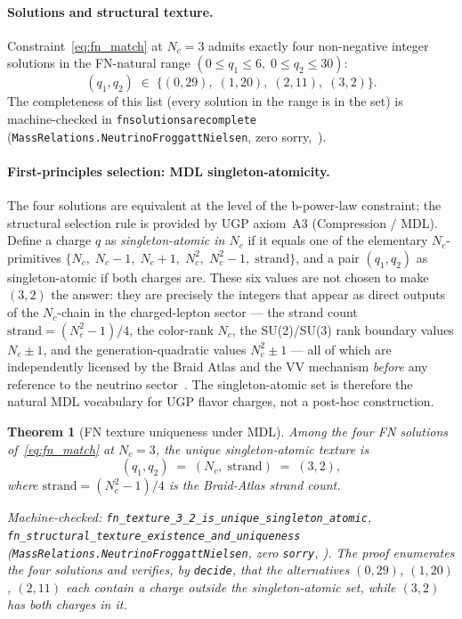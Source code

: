 \documentclass[12pt,a4paper]{article}
\newtheorem{theorem}{Theorem}[section]
\theoremstyle{definition}
\theoremstyle{remark}
\newcommand{\lean}[1]{%
  \penalty-100
  \begingroup\def\_{\textunderscore\allowbreak}\texttt{#1}\endgroup}
\begin{document}
\paragraph{Solutions and structural texture.}
Constraint~\eqref{eq:fn_match} at $N_c = 3$ admits exactly four non-negative
integer solutions in the FN-natural range
$(0\le q_1\le 6,\; 0 \le q_2 \le 30)$:
\begin{equation}
  (q_1, q_2) \;\in\; \{(0,29),\;(1,20),\;(2,11),\;(3,2)\}.
\end{equation}
The completeness of this list (every solution in the range is in the set) is
machine-checked in \lean{fn\_solutions\_are\_complete}
(\texttt{MassRelations.NeutrinoFroggattNielsen}, zero sorry,~\cite{ugp-lean}).

\paragraph{First-principles selection: MDL singleton-atomicity.}
The four solutions are equivalent at the level of the b-power-law constraint;
the structural selection rule is provided by UGP axiom~A3 (Compression / MDL).
Define a charge $q$ as \emph{singleton-atomic in $N_c$} if it equals one of
the elementary $N_c$-primitives
$\{N_c,\; N_c{-}1,\; N_c{+}1,\; N_c^2,\; N_c^2{-}1,\; \mathrm{strand}\}$,
and a pair $(q_1, q_2)$ as singleton-atomic if both charges are.
These six values are not chosen to make $(3,2)$ the answer: they are
precisely the integers that appear as direct outputs of the $N_c$-chain in the
charged-lepton sector --- the strand count $\mathrm{strand} = (N_c^2-1)/4$,
the color-rank $N_c$, the SU(2)/SU(3) rank boundary values $N_c \pm 1$,
and the generation-quadratic values $N_c^2 \pm 1$ --- all of which are
independently licensed by the Braid Atlas and the VV mechanism
\emph{before} any reference to the neutrino sector~\cite{SpivackBraidAtlas,
Spivack2026_CyclotomicMass}. The singleton-atomic set is therefore the
natural MDL vocabulary for UGP flavor charges, not a post-hoc construction.

\begin{theorem}[FN texture uniqueness under MDL]
\label{thm:fn_texture_mdl}
Among the four FN solutions of~\eqref{eq:fn_match} at $N_c = 3$, the unique
singleton-atomic texture is
\[
  (q_1, q_2) \;=\; (N_c, \;\mathrm{strand}) \;=\; (3, 2),
\]
where $\mathrm{strand} = (N_c^2-1)/4$ is the Braid-Atlas strand count.

\medskip\noindent
\begin{sloppypar}
Machine-checked:
\nolinkurl{fn_texture_3_2_is_unique_singleton_atomic},
\nolinkurl{fn_structural_texture_existence_and_uniqueness}
(\texttt{MassRelations.\allowbreak{}Neutrino\-Froggatt\-Nielsen},
zero \texttt{sorry}, \cite{ugp-lean}).
The proof enumerates the four solutions and verifies, by \texttt{decide},
that the alternatives $(0, 29)$, $(1, 20)$, $(2, 11)$ each contain a charge
outside the singleton-atomic set, while $(3, 2)$ has both charges in it.
\end{sloppypar}
\end{theorem}
\end{document}

